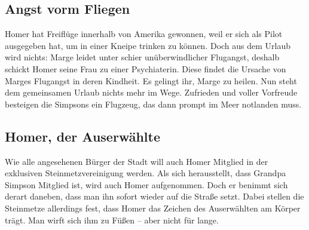 \subsection{Angst vorm Fliegen}\label{2F08}
Homer hat Freiflüge innerhalb von Amerika gewonnen, weil er sich als Pilot ausgegeben hat, um in einer Kneipe trinken zu können. Doch aus dem Urlaub wird nichts: Marge leidet unter schier unüberwindlicher Flugangst, deshalb schickt Homer seine Frau zu einer Psychiaterin. Diese findet die Ursache von Marges Flugangst in deren Kindheit. Es gelingt ihr, Marge zu heilen. Nun steht dem gemeinsamen Urlaub nichts mehr im Wege. Zufrieden und voller Vorfreude besteigen die Simpsons ein Flugzeug, das dann prompt im Meer notlanden muss.


	
\subsection{Homer, der Auserwählte}\label{2F09}
Wie alle angesehenen Bürger der Stadt will auch Homer Mitglied in der exklusiven Steinmetzvereinigung werden. Als sich herausstellt, dass Grandpa Simpson Mitglied ist, wird auch Homer aufgenommen. Doch er benimmt sich derart daneben, dass man ihn sofort wieder auf die Straße setzt. Dabei stellen die Steinmetze allerdings fest, dass Homer das Zeichen des Auserwählten am Körper trägt. Man wirft sich ihm zu Füßen -- aber nicht für lange.

